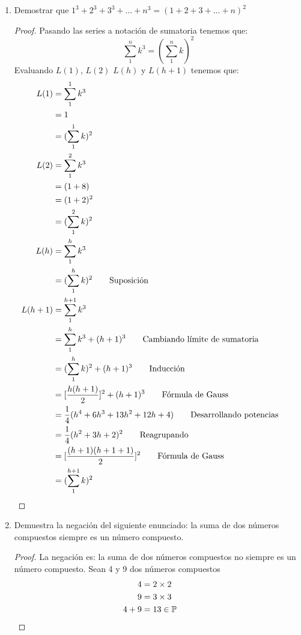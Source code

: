 \documentclass[a4paper,10pt]{article}
\begin{document}
\begin{enumerate}
  \item Demostrar que $1^3 + 2^3 + 3^3 + ... + n^3 = (1 + 2 + 3 + ... + n)^2$
    \begin{proof}
      Pasando las series a notación de sumatoria tenemos que: \[\sum_{1}^{n} k^3 = (\sum_{1}^{n} k)^2\] Evaluando $L(1)$, $L(2)$ $L(h)$ y $L(h+1)$ tenemos que:
       \begin{align*}
       L(1)&=\sum_{1}^{1} k^3
       \\ &= 1
       \\ &= (\sum_{1}^{1} k)^2
       \\ L(2) &= \sum_{1}^{2} k^3
       \\ &= (1 + 8)
       \\ &= (1 + 2)^2
       \\ &= (\sum_{1}^{2} k)^2
       \\ L(h)&=\sum_{1}^{h} k^3 
       \\ &= (\sum_{1}^{h} k )^2            \tag*{Suposición}
       \\ L(h+1) &= \sum_{1}^{h+1} k^3
       \\ &= \sum_{1}^{h} k^3 + (h + 1)^3    \tag*{Cambiando límite de sumatoria}
       \\ &= (\sum_{1}^{h} k )^2 + (h + 1)^3 \tag*{Inducción}
       \\ &= [\dfrac{h(h + 1)}{2}]^2 + (h + 1)^3 \tag*{Fórmula de Gauss}
       \\ &= \dfrac{1}{4}(h^4 + 6h^3 + 13h^2 + 12h + 4) \tag*{Desarrollando potencias}
       \\ &= \dfrac{1}{4}(h^2 + 3h + 2)^2       \tag*{Reagrupando}
       \\ &= [\dfrac{(h+1)(h+1+1)}{2}]^2        \tag*{Fórmula de Gauss}
       \\ &= (\sum_{1}^{h+1} k)^2            &&\qedhere
       \end{align*}
    \end{proof}
    
  \item Demuestra la negación del siguiente enunciado: la suma de dos números compuestos siempre es un número compuesto.
  \begin{proof}
    La negación es: la suma  de dos números compuestos no siempre es un número compuesto. Sean 4 y 9 dos números compuestos
    \begin{align*}
    4 &= 2 \times 2
    \\ 9 &= 3 \times 3
    \\ 4 + 9 &= 13 \in \mathbb{P} &&\qedhere
    \end{align*}
  \end{proof}
  

\end{enumerate}
\end{document}

